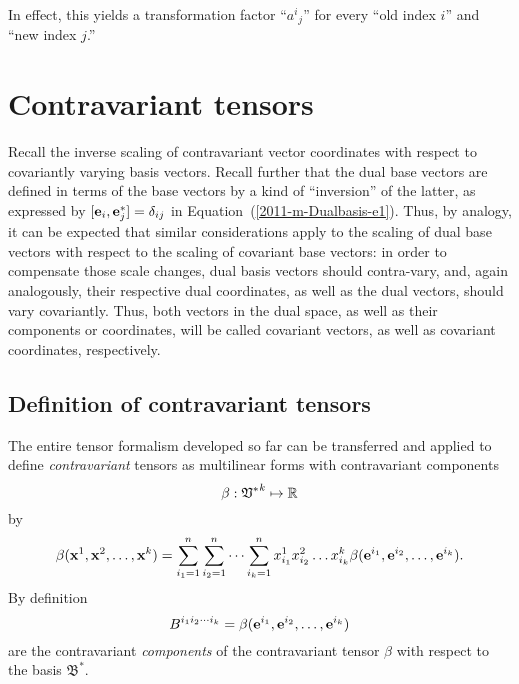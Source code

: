 In effect, this yields a transformation factor ``${a^i}_j$'' for every ``old index $i$'' and ``new index $j$.''



\section{Contravariant tensors}

Recall the inverse scaling of contravariant vector coordinates with respect to covariantly varying basis vectors.
Recall further that the dual base vectors are defined in terms of the base vectors by
a kind of ``inversion'' of the latter, as expressed by $[{\bf e}_i,  {\bf e}_j^*]=\delta_{ij}$
in Equation~(\ref{2011-m-Dualbasis-e1}).
Thus, by analogy, it can be expected that similar considerations apply to
the scaling of dual base vectors with respect to the scaling of covariant base vectors:
in order to compensate those scale changes, dual basis vectors should contra-vary,
and, again analogously,  their respective dual coordinates, as well as the dual vectors,
should vary covariantly.
Thus, both vectors in the dual space, as well as their components or coordinates, will be called covariant vectors,
as well as covariant coordinates, respectively.



\subsection{Definition of contravariant tensors}

The entire tensor formalism developed so far can be transferred and applied to define {\em contravariant} tensors
as multilinear forms with contravariant components
\begin{equation}
\beta:{ \frak V^\ast }^k \mapsto \mathbb{R}
\end{equation}
by
\begin{equation}
\beta ( {\bf x}^1,{\bf x}^2,\ldots ,{\bf x}^k)=
\sum_{i_1=1}^n
\sum_{i_2=1}^n
\cdots
\sum_{i_k=1}^n
x_{i_1}^1 x_{i_2}^2 \ldots x_{i_k}^k
\beta ( {\bf e}^{i_1},{\bf e}^{i_2},\ldots ,{\bf e}^{i_k}).
\end{equation}
By definition
\begin{equation}
B^{{i_1}{i_2}\cdots {i_k}}=\beta ( {\bf e}^{i_1},{\bf e}^{i_2},\ldots ,{\bf e}^{i_k})
\label{2011-m-tvtcontrav}
\end{equation}
 are the contravariant
{\em components} of the contravariant tensor $\beta $ with respect to the basis
${\mathfrak B}^\ast$.








